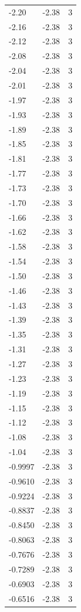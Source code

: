 \begin{longtable}{lrr}
  -2.20 & -2.38 & 3 \\
  -2.16 & -2.38 & 3 \\
  -2.12 & -2.38 & 3 \\
  -2.08 & -2.38 & 3 \\
  -2.04 & -2.38 & 3 \\
  -2.01 & -2.38 & 3 \\
  -1.97 & -2.38 & 3 \\
  -1.93 & -2.38 & 3 \\
  -1.89 & -2.38 & 3 \\
  -1.85 & -2.38 & 3 \\
  -1.81 & -2.38 & 3 \\
  -1.77 & -2.38 & 3 \\
  -1.73 & -2.38 & 3 \\
  -1.70 & -2.38 & 3 \\
  -1.66 & -2.38 & 3 \\
  -1.62 & -2.38 & 3 \\
  -1.58 & -2.38 & 3 \\
  -1.54 & -2.38 & 3 \\
  -1.50 & -2.38 & 3 \\
  -1.46 & -2.38 & 3 \\
  -1.43 & -2.38 & 3 \\
  -1.39 & -2.38 & 3 \\
  -1.35 & -2.38 & 3 \\
  -1.31 & -2.38 & 3 \\
  -1.27 & -2.38 & 3 \\
  -1.23 & -2.38 & 3 \\
  -1.19 & -2.38 & 3 \\
  -1.15 & -2.38 & 3 \\
  -1.12 & -2.38 & 3 \\
  -1.08 & -2.38 & 3 \\
  -1.04 & -2.38 & 3 \\
  -0.9997 & -2.38 & 3 \\
  -0.9610 & -2.38 & 3 \\
  -0.9224 & -2.38 & 3 \\
  -0.8837 & -2.38 & 3 \\
  -0.8450 & -2.38 & 3 \\
  -0.8063 & -2.38 & 3 \\
  -0.7676 & -2.38 & 3 \\
  -0.7289 & -2.38 & 3 \\
  -0.6903 & -2.38 & 3 \\
  -0.6516 & -2.38 & 3 \\

\end{longtable}
